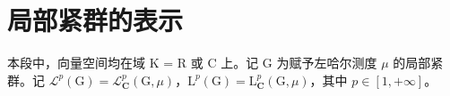 \section{局部紧群的表示}

本段中，向量空间均在域 K = R 或 C 上。记 G 为赋予左哈尔测度 \(\mu\) 的局部紧群。记 \(\mathcal{L}^{p}(\mathrm{G}) = \mathcal{L}_{\mathbf{C}}^{p}(\mathrm{G}, \mu)\)，\(\mathrm{L}^{p}(\mathrm{G}) = \mathrm{L}_{\mathbf{C}}^{p}(\mathrm{G}, \mu)\)，其中 \(p \in [1, +\infty]\)。


